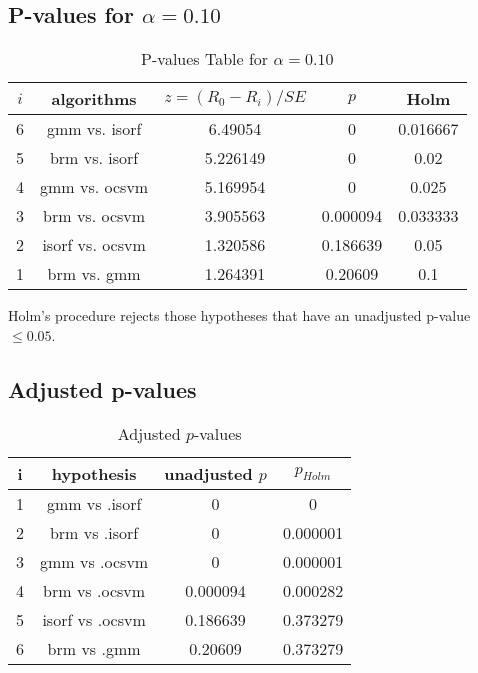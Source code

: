 \documentclass[a4paper,10pt]{article}
\begin{document}
\begin{landscape}
\pagebreak

\subsection{P-values for $\alpha=0.10$}

\begin{table}[!htp]
\centering\scriptsize
\begin{tabular}{ccccc}
$i$&algorithms&$z=(R_0 - R_i)/SE$&$p$&Holm\\
\hline6&gmm vs. isorf&6.49054&0&0.016667\\
5&brm vs. isorf&5.226149&0&0.02\\
4&gmm vs. ocsvm&5.169954&0&0.025\\
3&brm vs. ocsvm&3.905563&0.000094&0.033333\\
2&isorf vs. ocsvm&1.320586&0.186639&0.05\\
1&brm vs. gmm&1.264391&0.20609&0.1\\
\hline
\end{tabular}
\caption{P-values Table for $\alpha=0.10$}
\end{table}Holm's procedure rejects those hypotheses that have an unadjusted p-value $\le0.05$.

\pagebreak

\subsection{Adjusted p-values}

\begin{table}[!htp]
\centering\scriptsize
\begin{tabular}{cccc}
i&hypothesis&unadjusted $p$&$p_{Holm}$\\
\hline1&gmm vs .isorf&0&0\\
2&brm vs .isorf&0&0.000001\\
3&gmm vs .ocsvm&0&0.000001\\
4&brm vs .ocsvm&0.000094&0.000282\\
5&isorf vs .ocsvm&0.186639&0.373279\\
6&brm vs .gmm&0.20609&0.373279\\
\hline
\end{tabular}
\caption{Adjusted $p$-values}
\end{table}

\end{landscape}
\end{document}
